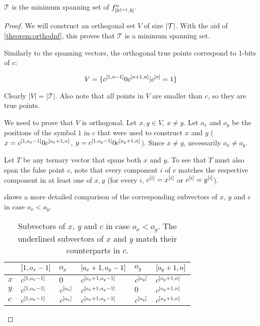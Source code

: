 \begin{theorem}[Optimality]
\label{proof:prefixoptimal}
$\mathcal{T}$ is the minimum spanning set of
$f^{n}_{[0^{\{n\}}, b]}$.
\end{theorem}

\begin{proof}
We will construct an orthogonal set $V$
of size $\lvert\mathcal{T}\rvert$.
With the aid of \autoref{theorem:orthodnf},
this proves that $\mathcal{T}$ is a minimum spanning set.

Similarly to the spanning vectors,
the orthogonal true points correspond to $1$-bits of $c$:

\[
V =
\{c^{[1, o - 1]} 0 c^{[o + 1, n]}
| c^{[o]} = 1\}
\]

Clearly $|V| = |\mathcal{T}|$.
Also note that all points in $V$ are smaller than $c$,
so they are true points.

We need to prove that $V$ is orthogonal.
Let $x, y \in V$, $x \neq y$.
Let $o_x$ and $o_y$ be the positions of the symbol $1$
in $c$
that were used to construct $x$ and $y$
($x = c^{[1, o_x - 1]} 0 c^{[o_x + 1, n]}$,
$y = c^{[1, o_y - 1]} 0 c^{[o_y + 1, n]}$).
Since $x \neq y$, necessarily $o_x \neq o_y$.

Let $T$ be any ternary vector that spans both $x$ and $y$.
To see that $T$ must also span the false point $c$,
note that every component $i$ of $c$
matches the respective component in at least one of $x,y$
(for every $i$,
$c^{[i]} = x^{[i]}$ or $c^{[i]} = y^{[i]}$).

shows a more detailed comparison
of the corresponding subvectors of $x$, $y$ and $c$
in case $o_x < o_y$.

\begin{table}[h]
\centering
\begin{tabular}{l|lllll}
& $[1, o_x - 1]$ & $o_x$
& $[o_x + 1, o_y - 1]$ & $o_y$
& $[o_y + 1, n]$ \\
\hline
$x$
& \underline{$c^{[1, o_x - 1]}$}
& $0$
& \underline{$c^{[o_x + 1, o_y - 1]}$}
& \underline{$c^{[o_y]}$}
& \underline{$c^{[o_y + 1, n]}$} \\
$y$
& \underline{$c^{[1, o_x - 1]}$}
& \underline{$c^{[o_x]}$}
& \underline{$c^{[o_x + 1, o_y - 1]}$}
& $0$
& \underline{$c^{[o_y + 1, n]}$} \\
\hline
$c$
& $c^{[1, o_x - 1]}$
& $c^{[o_x]}$
& $c^{[o_x + 1, o_y - 1]}$
& $c^{[o_y]}$
& $c^{[o_y + 1, n]}$
\end{tabular}
\caption[Subvectors of $x$, $y$ and $c$
in case $o_x < o_y$]
{Subvectors of $x$, $y$ and $c$
in case $o_x < o_y$.
The underlined subvectors of $x$ and $y$
match their counterparts in $c$.}
\label{tab:xyc}
\end{table}


\end{proof}
